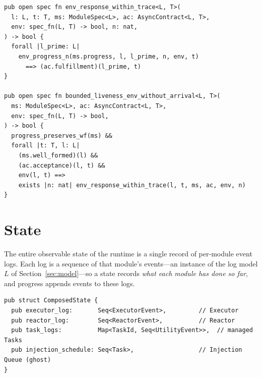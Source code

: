 \documentclass[11pt]{article}
\theoremstyle{plain}
\theoremstyle{definition}
\begin{document}
\begin{lstlisting}[caption={The Verus definition of $\mathsf{BoundedLiveness}$ (env-filtered form). Here \texttt{env} abbreviates the \emph{environmental assumption}; \texttt{progress\_preserves\_wf} requires \texttt{well\_formed} to be preserved by \emph{every} progress step; SMT trigger annotations are elided.},label={lst:bl}]
pub open spec fn env_response_within_trace<L, T>(
  l: L, t: T, ms: ModuleSpec<L>, ac: AsyncContract<L, T>,
  env: spec_fn(L, T) -> bool, n: nat,
) -> bool {
  forall |l_prime: L|
    env_progress_n(ms.progress, l, l_prime, n, env, t)
      ==> (ac.fulfillment)(l_prime, t)
}

pub open spec fn bounded_liveness_env_without_arrival<L, T>(
  ms: ModuleSpec<L>, ac: AsyncContract<L, T>,
  env: spec_fn(L, T) -> bool,
) -> bool {
  progress_preserves_wf(ms) &&
  forall |t: T, l: L|
    (ms.well_formed)(l) &&
    (ac.acceptance)(l, t) &&
    env(l, t) ==>
    exists |n: nat| env_response_within_trace(l, t, ms, ac, env, n)
}
\end{lstlisting}

\section{State}
\label{sec:state}

The entire observable state of the runtime is a single record of per-module event
logs. Each log is a sequence of that module's events---an instance of the log model
$L$ of Section~\ref{sec:model}---so a state records \emph{what each module has done
so far}, and progress appends events to these logs.

\begin{lstlisting}[caption={The composed runtime state. In the source, the sequence
types appear as the aliases \texttt{ExecutorLog} / \texttt{ReactorLog} /
\texttt{TaskLog}.},label={lst:state}]
pub struct ComposedState {
  pub executor_log:       Seq<ExecutorEvent>,         // Executor
  pub reactor_log:        Seq<ReactorEvent>,          // Reactor
  pub task_logs:          Map<TaskId, Seq<UtilityEvent>>,  // managed Tasks
  pub injection_schedule: Seq<Task>,                  // Injection Queue (ghost)
}
\end{lstlisting}
\end{document}
